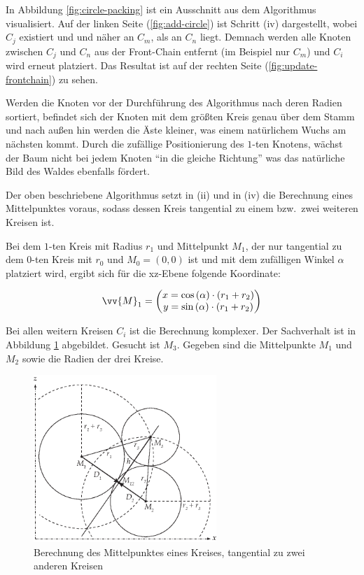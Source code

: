 In Abbildung \ref{fig:circle-packing} ist ein Ausschnitt aus dem Algorithmus visualisiert. Auf der linken Seite (\ref{fig:add-circle}) ist Schritt (iv) dargestellt, wobei $C_j$ existiert und und näher an $C_m$, als an $C_n$ liegt. Demnach werden alle Knoten zwischen $C_j$ und $C_n$ aus der Front-Chain entfernt (im Beispiel nur $C_m$) und $C_i$ wird erneut platziert. Das Resultat ist auf der rechten Seite (\ref{fig:update-frontchain}) zu sehen.

Werden die Knoten vor der Durchführung des Algorithmus nach deren Radien sortiert, befindet sich der Knoten mit dem größten Kreis genau über dem Stamm und nach außen hin werden die Äste kleiner, was einem natürlichem Wuchs am nächsten kommt. Durch die zufällige Positionierung des $1$-ten Knotens, wächst der Baum nicht bei jedem Knoten "`in die gleiche Richtung"' was das natürliche Bild des Waldes ebenfalls fördert.

Der oben beschriebene Algorithmus setzt in (ii) und in (iv) die Berechnung eines Mittelpunktes voraus, sodass dessen Kreis tangential zu einem bzw.\ zwei weiteren Kreisen ist.

Bei dem $1$-ten Kreis mit Radius $r_1$ und Mittelpunkt $M_1$, der nur tangential zu dem $0$-ten Kreis mit $r_0$ und $M_0 = (0,0)$ ist und mit dem zufälligen Winkel $\alpha$ platziert wird, ergibt sich für die xz-Ebene folgende Koordinate:

\begin{equation}
  \vv{M}_1 =
  \begin{pmatrix}
    x = \cos\left(\alpha\right) \cdot \left(r_1 + r_2\right)\\
    y = \sin\left(\alpha\right) \cdot \left(r_1 + r_2\right)\\
  \end{pmatrix}
\end{equation}

Bei allen weitern Kreisen $C_i$ ist die Berechnung komplexer. Der Sachverhalt ist in Abbildung \ref{fig:tangent-circle} abgebildet. Gesucht ist $M_3$. Gegeben sind die Mittelpunkte $M_1$ und $M_2$ sowie die Radien der drei Kreise.

\begin{figure}[htb]
  \includegraphics[width=261.593px]{figures/tangent-circle}
  \caption{Berechnung des Mittelpunktes eines Kreises, tangential zu zwei anderen Kreisen}
  \label{fig:tangent-circle}
\end{figure}

